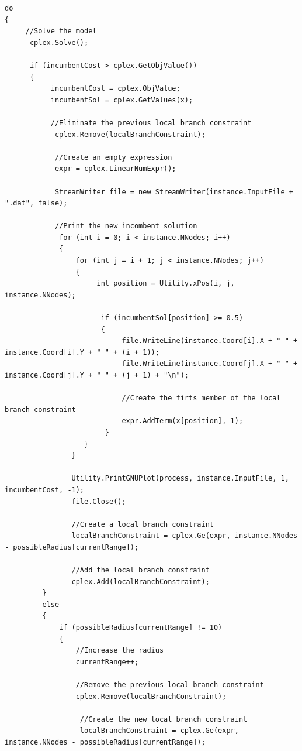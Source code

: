 \documentclass[11pt]{article}
\begin{document}
\begin{lstlisting}
do
{
     //Solve the model
      cplex.Solve();
                
      if (incumbentCost > cplex.GetObjValue())
      {
           incumbentCost = cplex.ObjValue;
           incumbentSol = cplex.GetValues(x);

           //Eliminate the previous local branch constraint
            cplex.Remove(localBranchConstraint);

            //Create an empty expression
            expr = cplex.LinearNumExpr();

            StreamWriter file = new StreamWriter(instance.InputFile + ".dat", false);

            //Print the new incombent solution
             for (int i = 0; i < instance.NNodes; i++)
             {
                 for (int j = i + 1; j < instance.NNodes; j++)
                 {
                      int position = Utility.xPos(i, j, instance.NNodes);

                       if (incumbentSol[position] >= 0.5)
                       {
                            file.WriteLine(instance.Coord[i].X + " " + instance.Coord[i].Y + " " + (i + 1));
                            file.WriteLine(instance.Coord[j].X + " " + instance.Coord[j].Y + " " + (j + 1) + "\n");

                            //Create the firts member of the local branch constraint
                            expr.AddTerm(x[position], 1);
                        }
                   }
                }

                Utility.PrintGNUPlot(process, instance.InputFile, 1, incumbentCost, -1);
                file.Close();
                 
                //Create a local branch constraint
                localBranchConstraint = cplex.Ge(expr, instance.NNodes - possibleRadius[currentRange]);
                 
                //Add the local branch constraint
                cplex.Add(localBranchConstraint);
         }
         else
         {
             if (possibleRadius[currentRange] != 10)
             {
                 //Increase the radius
                 currentRange++;

                 //Remove the previous local branch constraint
                 cplex.Remove(localBranchConstraint);
                       
                  //Create the new local branch constraint
                  localBranchConstraint = cplex.Ge(expr, instance.NNodes - possibleRadius[currentRange]);


\end{lstlisting}
\end{document}
